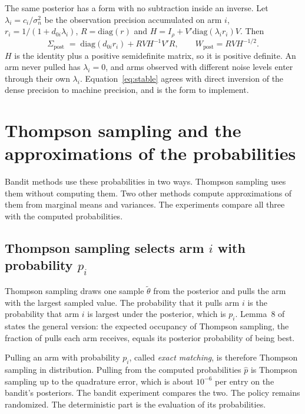 \documentclass[11pt]{article}
\begin{document}
The same posterior has a form with no subtraction inside an inverse.
Let $\lambda_i = c_i / \sigma_n^2$ be the observation precision
accumulated on arm $i$, $r_i = 1/(1 + d_{0i} \lambda_i)$,
$R = \mathrm{diag}(r)$ and $H = I_\rho + V' \mathrm{diag}(\lambda_i
r_i) V$. Then
\begin{equation}
\Sigma_{\text{post}} \;=\; \mathrm{diag}(d_{0i} r_i) + R V H^{-1} V' R,
\qquad W_{\text{post}} = R V H^{-1/2}.
\label{eq:stable}
\end{equation}
$H$ is the identity plus a positive semidefinite matrix, so it is
positive definite. An arm never pulled has $\lambda_i = 0$, and arms
observed with different noise levels enter through their own
$\lambda_i$. Equation~\eqref{eq:stable} agrees with direct inversion
of the dense precision to machine precision, and is the form to
implement.

\section{Thompson sampling and the approximations of the probabilities}
\label{sec:surrogates}

Bandit methods use these probabilities in two ways. Thompson sampling uses them without computing them. Two other methods compute approximations of them from marginal means and variances. The experiments compare all three with the computed probabilities.

\subsection{Thompson sampling selects arm $i$ with probability $p_i$}

Thompson sampling draws one sample $\tilde{\theta}$ from the
posterior and pulls the arm with the largest sampled value. The
probability that it pulls arm $i$ is the probability that arm $i$ is
largest under the posterior, which is $p_i$. Lemma~8 of
\citet{tarbouriech2023} states the general version: the expected occupancy of Thompson sampling, the fraction of pulls each arm receives, equals its posterior probability of being best.

Pulling an arm with probability $p_i$, called \emph{exact matching},
is therefore Thompson sampling in distribution. Pulling from the computed probabilities $\hat p$ is Thompson sampling up to the quadrature
error, which is about $10^{-6}$ per entry on the bandit's posteriors.
The bandit experiment compares the two. The policy remains
randomized. The deterministic part is the evaluation of its
probabilities.
\end{document}
